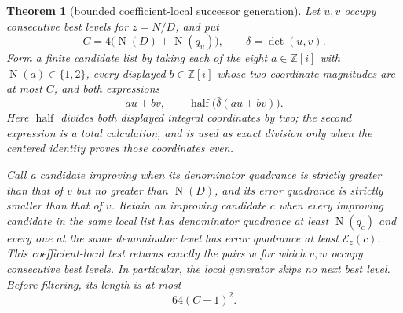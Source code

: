 \documentclass[11pt]{article}
\newtheorem{theorem}{Theorem}[section]
\newcommand{\Zi}{\mathbb{Z}[i]}
\newcommand{\Norm}[1]{\operatorname{N}\!\left(#1\right)}
\begin{document}
\begin{theorem}[bounded coefficient-local successor generation]
\label{thm:local-successor-generation}
Let $u,v$ occupy consecutive best levels for $z=N/D$, and put
\[
 C=4\bigl(\Norm D+\Norm{q_u}\bigr),
 \qquad \delta=\det(u,v).
\]
Form a finite candidate list by taking each of the eight
$a\in\Zi$ with $\Norm a\in\{1,2\}$, every displayed $b\in\Zi$ whose two
coordinate magnitudes are at most $C$, and both expressions
\begin{equation}
 au+bv,
 \qquad
 \operatorname{half}\bigl(\bar\delta(au+bv)\bigr).
 \label{eq:local-successor-forms}
\end{equation}
Here $\operatorname{half}$ divides both displayed integral coordinates by
two; the second expression is a total calculation, and is used as exact
division only when the centered identity proves those coordinates even.

Call a candidate \emph{improving} when its denominator quadrance is strictly
greater than that of $v$ but no greater than $\Norm D$, and its error
quadrance is strictly smaller than that of $v$.  Retain an improving candidate
$c$ when every improving candidate in the same local list has denominator
quadrance at least $\Norm{q_c}$ and every one at the same denominator level has
error quadrance at least $\mathcal E_z(c)$.  This coefficient-local test
returns exactly the pairs $w$ for which $v,w$ occupy consecutive best levels.
In particular, the local generator skips no next best level.  Before
filtering, its length is at most
\begin{equation}
                         64(C+1)^2.
 \label{eq:local-successor-count}
\end{equation}
\end{theorem}
\end{document}
